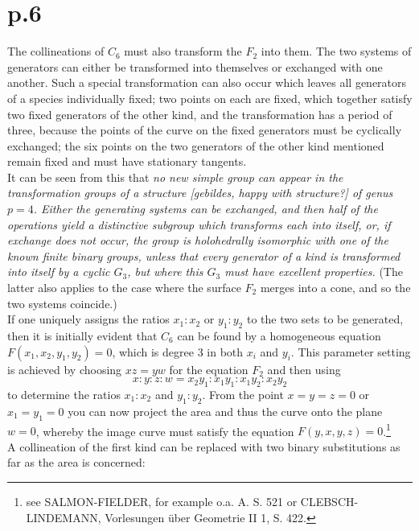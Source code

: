 \documentclass[leqno]{article}
\begin{document}
\section{p.6}
The collineations of $ C_6 $ must also transform the $ F_2 $ into them. The two systems of generators can either be transformed into themselves or exchanged with one another. Such a special transformation can also occur which leaves all generators of a species individually fixed; two points on each are fixed, which together satisfy two fixed generators of the other kind, and the transformation has a period of three, because the points of the curve on the fixed generators must be cyclically exchanged; the six points on the two generators of the other kind mentioned remain fixed and must have stationary tangents. \\
It can be seen from this that \textit{no new simple group can appear in the transformation groups of a structure [gebildes, happy with structure?] of genus $ p = 4 $. Either the generating systems can be exchanged, and then half of the operations yield a distinctive subgroup which transforms each into itself, or, if exchange does not occur, the group is holohedrally isomorphic with one of the known finite binary groups, unless that every generator of a kind is transformed into itself by a cyclic $ G_3 $, but where this $ G_3 $ must have excellent properties.} (The latter also applies to the case where the surface $ F_2 $ merges into a cone, and so the two systems coincide.) \\
If one uniquely assigns the ratios $ x_1: x_2 $ or $ y_1: y_2 $ to the two sets to be generated, then it is initially evident that $ C_6 $ can be found by a homogeneous equation $ F (x_1, x_2, y_1, y_2) = 0 $, which is degree 3 in both $ x_i $ and $ y_i $. This parameter setting is achieved by choosing $ xz = yw $ for the equation $F_2$  and then using
\begin{equation}\label{eq: 2.1}
x: y : z : w = x_2y_1 :x_1 y_1 : x_1 y_2: x_2 y_2 \tag{1}
\end{equation}
to determine the ratios $ x_1: x_2 $ and $ y_1: y_2 $. From the point $ x = y = z = 0 $ or $ x_1 = y_1 = 0 $ you can now project the area and thus the curve onto the plane $ w = 0 $, whereby the image curve must satisfy the equation $F(y, x, y, z) = 0$.\footnote{see SALMON-FIELDER, for example o.a. A. S. 521 or CLEBSCH-LINDEMANN, Vorlesungen \"uber Geometrie II 1, S. 422.} \\
A collineation of the first kind can be replaced with two binary substitutions as far as the area is concerned:
\end{document}
